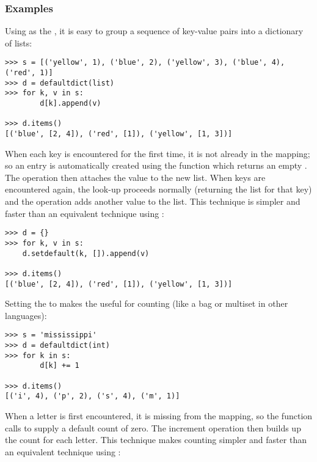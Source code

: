 \subsubsection{ Examples \label{defaultdict-examples}}

Using  as the , it is easy to group
a sequence of key-value pairs into a dictionary of lists:

\begin{verbatim}
>>> s = [('yellow', 1), ('blue', 2), ('yellow', 3), ('blue', 4), ('red', 1)]
>>> d = defaultdict(list)
>>> for k, v in s:
        d[k].append(v)

>>> d.items()
[('blue', [2, 4]), ('red', [1]), ('yellow', [1, 3])]
\end{verbatim}

When each key is encountered for the first time, it is not already in the
mapping; so an entry is automatically created using the
 function which returns an empty .  The
 operation then attaches the value to the new list.  When
keys are encountered again, the look-up proceeds normally (returning the list
for that key) and the  operation adds another value to
the list. This technique is simpler and faster than an equivalent technique
using :

\begin{verbatim}
>>> d = {}
>>> for k, v in s:
	d.setdefault(k, []).append(v)

>>> d.items()
[('blue', [2, 4]), ('red', [1]), ('yellow', [1, 3])]
\end{verbatim}

Setting the  to  makes the
 useful for counting (like a bag or multiset in other
languages):

\begin{verbatim}
>>> s = 'mississippi'
>>> d = defaultdict(int)
>>> for k in s:
        d[k] += 1

>>> d.items()
[('i', 4), ('p', 2), ('s', 4), ('m', 1)]
\end{verbatim}

When a letter is first encountered, it is missing from the mapping, so the
 function calls  to supply a default
count of zero.  The increment operation then builds up the count for each
letter. This technique makes counting simpler and faster than an equivalent
technique using :

